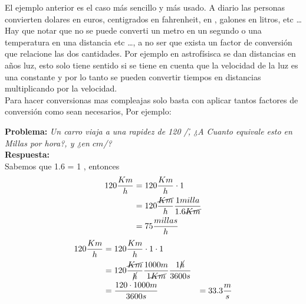 El ejemplo anterior es el caso m\'as sencillo y m\'as usado. A diario las personas convierten dolares en euros, centigrados en fahrenheit, \km en \mile, galones en litros, etc \ldots\\
Hay que notar que no se puede converti un metro en un segundo o una temperatura en una distancia etc \ldots , a no ser que exista un factor de conversi\'on que relacione las dos cantidades. Por ejemplo en astrof\'isisca se dan distancias en a\~nos luz, esto solo tiene sentido si se tiene en cuenta que la velocidad de la luz es una constante y por lo tanto se pueden convertir tiempos en distancias multiplicando por la velocidad.\\
Para hacer conversionas mas compleajas solo basta con aplicar tantos factores de conversi\'on como sean necesarios, Por ejemplo:
\begin{example}
\begin{tcolorbox}[colback=green!5!white,colframe=green!75!black,boxrule=0.5pt,arc=4pt,left=6pt,right=6pt,top=6pt,bottom=6pt,boxsep=0pt]
\textbf{Problema:} \textit{Un carro viaja a una rapidez de 120 \km/\h, ¿A Cuanto equivale esto en Millas por hora?, y ¿en $cm$/\s?}\\
\textbf{Respuesta:}\\ 
Sabemos que 1.6 \km = 1 \mile, entonces\\
\begin{align}
120 \frac{Km}{h} & = 120 \frac{Km}{h} \cdot 1 \\
                 & = 120 \frac{\cancel{Km}}{h} \frac{1 milla}{1.6 \cancel{Km}} \\ 
                 & = 75 \frac{millas}{h}
\end{align}
\begin{align}
120 \frac{Km}{h} & = 120 \frac{Km}{h} \cdot 1 \cdot 1 \\
                 & = 120 \frac{\cancel{Km}}{\cancel{h}} \frac{1000 m}{1 \cancel{Km}}\frac{1 \cancel{h}}{3600 s} \\
                 & = \frac{120 \cdot 1000 m}{3600 s}
                 & = 33.3 \frac{m}{s}
\end{align}
\end{tcolorbox}
\end{example}  






